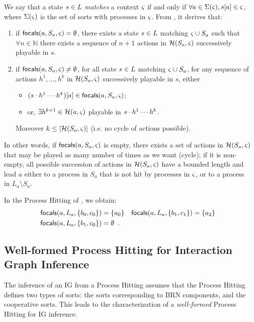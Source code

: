 We say that a state $s\in L$ \emph{matches} a context $\varsigma$ if and only if
$\forall a\in\Sigma(\varsigma), {s[a]}\in\varsigma$, where $\Sigma(\varsigma)$ is the set of sorts with
processes in $\varsigma$.
From , it derives that:
\begin{enumerate}
\item if $\mathsf{focals}(a,S_a,\varsigma)=\emptyset$, there exists a 
state $s\in L$ matching $\varsigma\cup S_a$ such that $\forall n\in\mathbb N$ there
exists a sequence of $n+1$ actions in $\mathcal{H}(S_a,\varsigma)$ successively playable in $s$.
\item if $\mathsf{focals}(a,S_a,\varsigma)\neq\emptyset$, for all
state $s\in L$ matching $\varsigma\cup S_a$,
for any sequence of actions $h^1,\dots,h^k$ in $\mathcal{H}(S_a,\varsigma)$ successively playable in $s$,
either
\begin{itemize}
\item $(s\cdot h^1\cdots h^k)[a] \in \mathsf{focals}(a,S_a,\varsigma)$;
\item or, $\exists h^{k+1}\in \mathcal{H}(a,\varsigma)$ playable in $s\cdot h^1\cdots h^k$.
\end{itemize}
Moreover $k\leq|\mathcal{H}(S_a,\varsigma)|$ (i.e. no cycle of actions possible).
\end{enumerate}

In other words, if $\mathsf{focals}(a,S_a,\varsigma)$ is empty, there exists a set of actions in
$\mathcal{H}(S_a,\varsigma)$ that may be played as many number of times as we want (cycle);
if it is non-empty, all possible succession of actions in $\mathcal{H}(S_a,\varsigma)$ have a bounded length and
lead $a$ either to a process in $S_a$ that is not hit by processes in $\varsigma$, or to a process in
$L_a\setminus S_a$.

\begin{example*}
In the Process Hitting of , we obtain:
\begin{align*}
\mathsf{focals}(a,L_a,\{b_0,c_0\}) &= \{ a_0 \}
&
\mathsf{focals}(a,L_a,\{b_1,c_1\}) &= \{ a_2 \}\\
\mathsf{focals}(a,L_a,\{b_1,c_0\}) &= \emptyset\enspace.
\end{align*}
\end{example*}

\subsection{Well-formed Process Hitting for Interaction Graph Inference}\label{ssec:wf}

The inference of an IG from a Process Hitting assumes that the Process Hitting defines two types of
sorts:
the sorts corresponding to BRN components, and the cooperative sorts.
This leads to the characterization of a \emph{well-formed} Process Hitting for IG inference.

